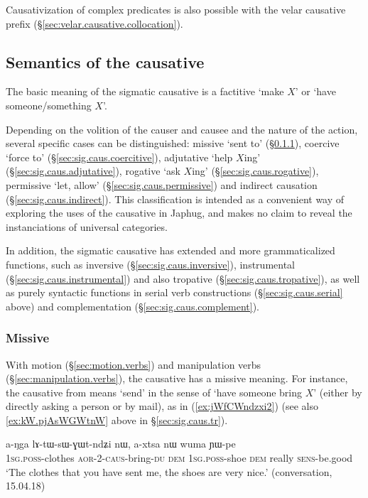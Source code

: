 Causativization of complex predicates is also possible with the velar causative prefix (§\ref{sec:velar.causative.collocation}).

\subsection{Semantics of the causative} \label{sec:sig.caus.function}
The basic meaning of the sigmatic causative is a factitive `make $X$' or `have someone/something $X$'. 

Depending on the volition of the causer and causee and the nature of the action, several specific cases can be distinguished: missive `sent to' (§\ref{sec:sig.caus.missive}), coercive `force to' (§\ref{sec:sig.caus.coercitive}), adjutative `help $X$ing' (§\ref{sec:sig.caus.adjutative}), rogative `ask $X$ing' (§\ref{sec:sig.caus.rogative}), permissive `let, allow' (§\ref{sec:sig.caus.permissive}) and indirect causation (§\ref{sec:sig.caus.indirect}). This classification is intended as a convenient way of exploring the uses of the causative in Japhug, and makes no claim to reveal the instanciations of universal categories.

In addition, the sigmatic causative has extended and more grammaticalized functions, such as inversive (§\ref{sec:sig.caus.inversive}), instrumental (§\ref{sec:sig.caus.instrumental}) and also tropative (§\ref{sec:sig.caus.tropative}), as well as purely syntactic functions in serial verb constructions (§\ref{sec:sig.caus.serial} above) and complementation (§\ref{sec:sig.caus.complement}).

\subsubsection{Missive} \label{sec:sig.caus.missive}
With motion (§\ref{sec:motion.verbs}) and manipulation verbs (§\ref{sec:manipulation.verbs}), the causative has a missive meaning. For instance, the causative  from  means `send' in the sense of `have someone bring $X$' (either by directly asking a person or by mail), as in (\ref{ex:jWfCWndzxi2}) (see also \ref{ex:kW.pjAsWGWtnW} above in §\ref{sec:sig.caus.tr}).

\begin{exe}
\ex \label{ex:jWfCWndzxi2}
\gll a-ŋga lɤ-tɯ-sɯ-ɣɯt-ndʑi nɯ, a-xtsa nɯ wuma ɲɯ-pe \\ 
\textsc{1sg}.\textsc{poss}-clothes \textsc{aor}-2-\textsc{caus}-bring-\textsc{du} \textsc{dem} \textsc{1sg}.\textsc{poss}-shoe \textsc{dem} really \textsc{sens}-be.good  \\
\glt `The clothes that you have sent me, the shoes are very nice.' (conversation, 15.04.18)
\end{exe}

